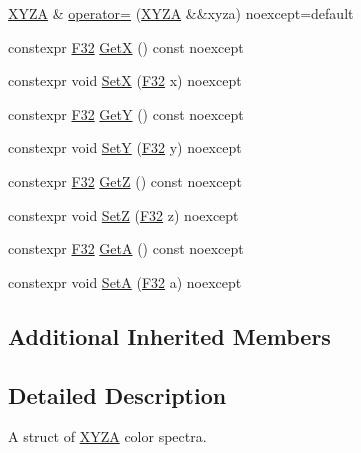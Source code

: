 \begin{DoxyCompactItemize}
\mbox{\hyperlink{structmage_1_1_x_y_z_a}{X\+Y\+ZA}} \& \mbox{\hyperlink{structmage_1_1_x_y_z_a_a54e3320e55516c1c0db38865a0036b47}{operator=}} (\mbox{\hyperlink{structmage_1_1_x_y_z_a}{X\+Y\+ZA}} \&\&xyza) noexcept=default
\item 
constexpr \mbox{\hyperlink{namespacemage_aa97e833b45f06d60a0a9c4fc22ae02c0}{F32}} \mbox{\hyperlink{structmage_1_1_x_y_z_a_ad8a87f85d80f41961d88657150d62d83}{GetX}} () const noexcept
\item 
constexpr void \mbox{\hyperlink{structmage_1_1_x_y_z_a_ae94002f96c710ac074672736e5f96a53}{SetX}} (\mbox{\hyperlink{namespacemage_aa97e833b45f06d60a0a9c4fc22ae02c0}{F32}} x) noexcept
\item 
constexpr \mbox{\hyperlink{namespacemage_aa97e833b45f06d60a0a9c4fc22ae02c0}{F32}} \mbox{\hyperlink{structmage_1_1_x_y_z_a_a218a44b26cb020ff6ebd730772425097}{GetY}} () const noexcept
\item 
constexpr void \mbox{\hyperlink{structmage_1_1_x_y_z_a_a2e1669b43888849e7b8ecff3619b3f61}{SetY}} (\mbox{\hyperlink{namespacemage_aa97e833b45f06d60a0a9c4fc22ae02c0}{F32}} y) noexcept
\item 
constexpr \mbox{\hyperlink{namespacemage_aa97e833b45f06d60a0a9c4fc22ae02c0}{F32}} \mbox{\hyperlink{structmage_1_1_x_y_z_a_a951b69d9024672c0d59f81e15c9f7f6b}{GetZ}} () const noexcept
\item 
constexpr void \mbox{\hyperlink{structmage_1_1_x_y_z_a_aabbeb3087741702e0d94ec989b516652}{SetZ}} (\mbox{\hyperlink{namespacemage_aa97e833b45f06d60a0a9c4fc22ae02c0}{F32}} z) noexcept
\item 
constexpr \mbox{\hyperlink{namespacemage_aa97e833b45f06d60a0a9c4fc22ae02c0}{F32}} \mbox{\hyperlink{structmage_1_1_x_y_z_a_a97ee3d29d5a8f2b7cd005458fc5a2f25}{GetA}} () const noexcept
\item 
constexpr void \mbox{\hyperlink{structmage_1_1_x_y_z_a_abbf1fe2475252fc2fa62588de5534dee}{SetA}} (\mbox{\hyperlink{namespacemage_aa97e833b45f06d60a0a9c4fc22ae02c0}{F32}} a) noexcept
\end{DoxyCompactItemize}
\subsection*{Additional Inherited Members}


\subsection{Detailed Description}
A struct of \mbox{\hyperlink{structmage_1_1_x_y_z_a}{X\+Y\+ZA}} color spectra. 

